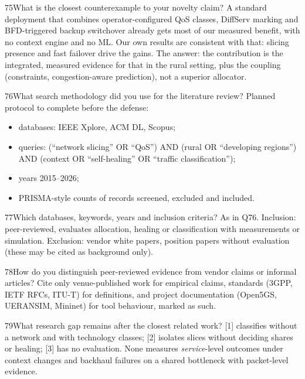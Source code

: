 \begin{qa}{75}{What is the closest counterexample to your novelty claim?}
A standard deployment that combines operator-configured QoS classes, DiffServ marking and BFD-triggered backup
switchover already gets most of our measured benefit, with no context engine and no ML. Our own results are
consistent with that: slicing presence and fast failover drive the gains. The answer: the contribution is the
integrated, measured evidence for that in the rural setting, plus the coupling (constraints, congestion-aware
prediction), not a superior allocator.
\end{qa}

\begin{qa}{76}{What search methodology did you use for the literature review?}
Planned protocol to complete before the defense:
\begin{itemize}
\item databases: IEEE Xplore, ACM DL, Scopus;
\item queries: (``network slicing'' OR ``QoS'') AND (rural OR ``developing regions'') AND (context OR ``self-healing'' OR
``traffic classification'');
\item years 2015--2026;
\item PRISMA-style counts of records screened, excluded and included.
\end{itemize}
\end{qa}

\begin{qa}{77}{Which databases, keywords, years and inclusion criteria?}
As in Q76. Inclusion: peer-reviewed, evaluates allocation, healing or classification with measurements or simulation.
Exclusion: vendor white papers, position papers without evaluation (these may be cited as background only).
\end{qa}

\begin{qa}{78}{How do you distinguish peer-reviewed evidence from vendor claims or informal articles?}
Cite only venue-published work for empirical claims, standards (3GPP, IETF RFCs, ITU-T) for definitions, and project
documentation (Open5GS, UERANSIM, Mininet) for tool behaviour, marked as such.
\end{qa}

\begin{qa}{79}{What research gap remains after the closest related work?}
[1] classifies without a network and with technology classes; [2] isolates slices without deciding shares or healing;
[3] has no evaluation. None measures \emph{service}-level outcomes under context changes and backhaul failures on a
shared bottleneck with packet-level evidence.
\end{qa}

